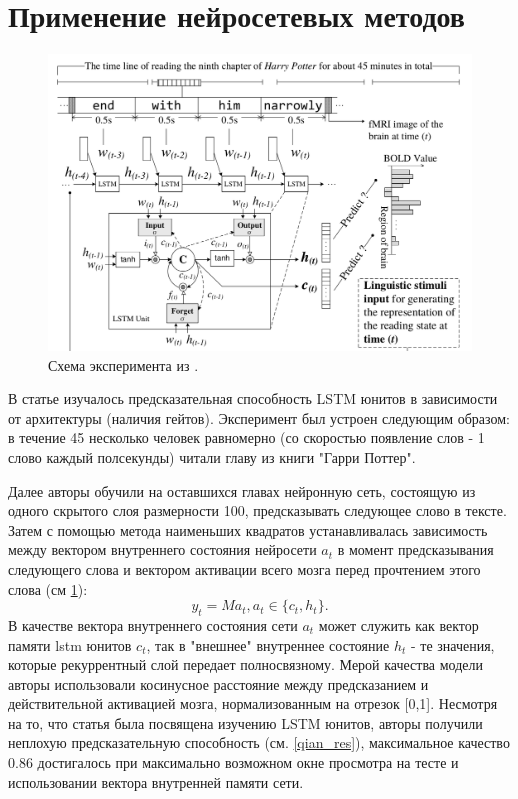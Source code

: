\documentclass[pdftex,ptm,12pt,a4paper]{report}
\theoremstyle{definition}
\begin{document}
\section{Применение нейросетевых методов}

\begin{figure}[h]
\includegraphics[scale=0.3]{images/lstm.png}
\centering
\caption{Схема эксперимента из \cite{qian2016bridging}.}
\label{ch_experiment}
\end{figure}

В статье \cite{qian2016bridging} изучалось предсказательная способность LSTM юнитов в зависимости от архитектуры (наличия гейтов). Эксперимент был устроен следующим образом: в течение 45 несколько человек равномерно (со скоростью появление слов - 1 слово каждый полсекунды) читали главу из книги "Гарри Поттер".

Далее авторы обучили на оставшихся главах нейронную сеть, состоящую из одного скрытого слоя  размерности 100, предсказывать следующее слово в тексте. Затем с помощью метода наименьших квадратов устанавливалась зависимость между вектором внутреннего состояния нейросети $a_t$ в момент предсказывания следующего слова и вектором активации всего мозга перед прочтением этого слова (см \ref{ch_experiment}):
$$ y_t = M a_t, a_t \in \{c_t, h_t\}.$$
В качестве вектора внутреннего состояния сети $a_t$ может служить как вектор памяти lstm юнитов $c_t$, так в "внешнее" внутреннее состояние $h_t$ - те значения, которые рекуррентный слой передает полносвязному.
Мерой качества модели авторы использовали косинусное расстояние между предсказанием и действительной активацией мозга, нормализованным на отрезок [0,1]. Несмотря на то, что статья была посвящена изучению LSTM юнитов, авторы получили неплохую предсказательную способность (см. \ref{qian_res}), максимальное качество 0.86 достигалось при максимально возможном окне просмотра на тесте и использовании вектора внутренней памяти сети.
\end{document}
